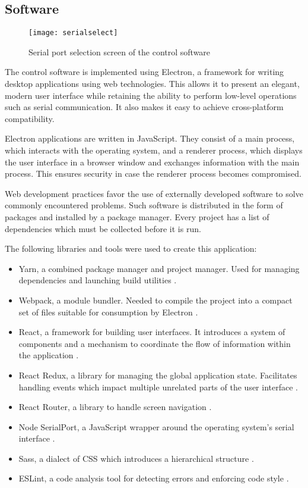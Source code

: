 \clearpage
\subsection{Software}

\begin{figure}[ht]
    \begin{center}
        \texttt{[image: serialselect]}
        \caption{Serial port selection screen of the control software}
        \label{serialselect}
    \end{center}
\end{figure}

The control software is implemented using Electron, a framework for writing
desktop applications using web technologies. This allows it to present an
elegant, modern user interface while retaining the ability to perform low-level
operations such as serial communication. It also makes it easy to achieve
cross-platform compatibility.

Electron applications are written in JavaScript. They consist of a main process,
which interacts with the operating system, and a renderer process, which
displays the user interface in a browser window and exchanges information with
the main process. This ensures security in case the renderer process becomes
compromised.

Web development practices favor the use of externally developed software to
solve commonly encountered problems. Such software is distributed in the form of
packages and installed by a package manager. Every project has a list of
dependencies which must be collected before it is run.

The following libraries and tools were used to create this application:

\begin{itemize}
    \item Yarn, a combined package manager and project manager. Used for
    managing dependencies and launching build utilities \cite{yarn}.
    \item Webpack, a module bundler. Needed to compile the project into a
    compact set of files suitable for consumption by Electron \cite{webpack}.
    \item React, a framework for building user interfaces. It introduces a
    system of components and a mechanism to coordinate the flow of information
    within the application \cite{react}.
    \item React Redux, a library for managing the global application state.
    Facilitates handling events which impact multiple unrelated parts of the
    user interface \cite{redux}.
    \item React Router, a library to handle screen navigation \cite{router}.
    \item Node SerialPort, a JavaScript wrapper around the operating system's
    serial interface \cite{nodeserial}.
    \item Sass, a dialect of CSS which introduces a hierarchical structure
    \cite{sass}.
    \item ESLint, a code analysis tool for detecting errors and enforcing code
    style \cite{eslint}.
\end{itemize}

